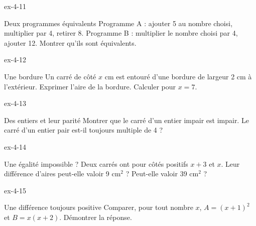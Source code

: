 \clearpage{}
\begin{blocLivre}{ex-4-11}\begin{exercice}[3]{Deux programmes équivalents}
Programme A : ajouter 5 au nombre choisi, multiplier par 4, retirer 8. Programme B : multiplier le nombre choisi par 4, ajouter 12. Montrer qu’ils sont équivalents.
\end{exercice}\end{blocLivre}
\begin{blocLivre}{ex-4-12}\begin{exercice}[3]{Une bordure}
Un carré de côté $x$ cm est entouré d’une bordure de largeur 2 cm à l’extérieur. Exprimer l’aire de la bordure. Calculer pour $x=7$.
\label{fig-ex-4-12}
\end{exercice}\end{blocLivre}
\begin{blocLivre}{ex-4-13}\begin{exercice}[3]{Des entiers et leur parité}
Montrer que le carré d’un entier impair est impair. Le carré d’un entier pair est-il toujours multiple de 4 ?
\end{exercice}\end{blocLivre}
\begin{blocLivre}{ex-4-14}\begin{exercice}[3]{Une égalité impossible ?}
Deux carrés ont pour côtés positifs $x+3$ et $x$. Leur différence d’aires peut-elle valoir 9 cm$^2$ ? Peut-elle valoir 39 cm$^2$ ?
\end{exercice}\end{blocLivre}
\begin{blocLivre}{ex-4-15}\begin{exercice}[3]{Une différence toujours positive}
Comparer, pour tout nombre $x$, $A=(x+1)^2$ et $B=x(x+2)$. Démontrer la réponse.
\end{exercice}\end{blocLivre}

\clearpage
